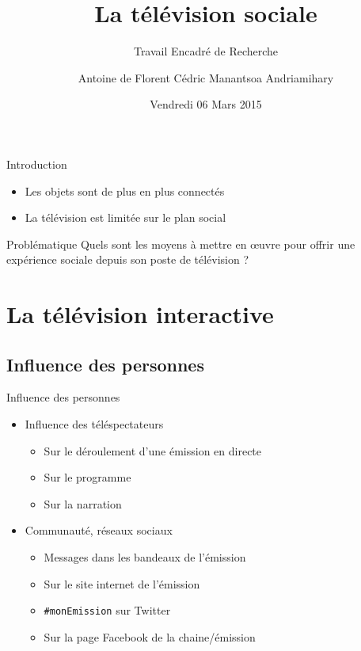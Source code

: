 \documentclass{beamer}
\title[] %
{La télévision sociale}
\subtitle{Travail Encadré de Recherche}
\author[
\textbf{F}lorent\\
\textbf{A}ntoine\\
\textbf{C}édric\\
Manan\textbf{T}soa
] %
{Antoine de \bsc{Roquemaurel}\newline Florent \bsc{Berbie}\newline Cédric \bsc{Rohaut}\newline Manantsoa Andriamihary \bsc{Razanajatovo}}
\institute[] %
{
  Universit\'e Toulouse III -- Paul Sabatier \\
  M1 Informatique -- Développement Logiciel 
  \vspace{-10px}
}
\date[ ~ ~ ~ 05 / 03 / 2015] %
{Vendredi 06 Mars 2015}
\begin{document}
	\begin{frame}
		\titlepage
	\end{frame}
	\begin{frame}{Introduction}
	\begin{itemize}
		\item Les objets sont de plus en plus connectés
		\pause
		\item La télévision est limitée sur le plan social
	\end{itemize}
	\vfill
	\pause
	\begin{block}{Problématique}
		Quels sont les moyens à mettre en œuvre pour offrir une expérience sociale depuis son poste de télévision ?
	\end{block}
	\end{frame}
	\begin{frame}
		\tableofcontents
	\end{frame}
	\section{La télévision interactive}
	\subsection{Influence des personnes}
	\begin{frame}{Influence des personnes}
\begin{itemize}
	\item Influence des téléspectateurs
		\begin{itemize}
			\item Sur le déroulement d'une émission en directe
			\item Sur le programme
			\item Sur la narration
		\end{itemize}
	\pause
		\vfill
	\item Communauté, réseaux sociaux
		\begin{itemize}
			\item Messages dans les bandeaux de l'émission
			\item Sur le site internet de l'émission
			\item \texttt{\#monEmission} sur Twitter
			\item Sur la page Facebook de la chaine/émission
		\end{itemize}
		\vfill
\end{itemize}
	\end{frame}
\end{document}

